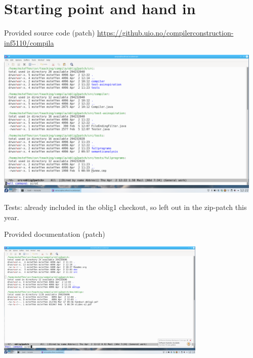 \documentclass{beamer}
\begin{document}
\section{Starting point and hand in}
\label{sec:org29de54a}
\begin{frame}[label={sec:orgedfebaf}]{Provided source code (patch)}
\url{https://github.uio.no/compilerconstruction-inf5110/compila}

\includegraphics[width=0.96\textwidth]{figures/snaps/directorystructure-src}

Tests: already included in the oblig1 checkout, so left out in the zip-patch
this year.
\end{frame}
\begin{frame}[label={sec:org79ceddc}]{Provided documentation (patch)}

\begin{center}
 \includegraphics[width=0.75\textwidth]{figures/snaps/directorystructure-doc}
\end{center}
\end{frame}
\end{document}
